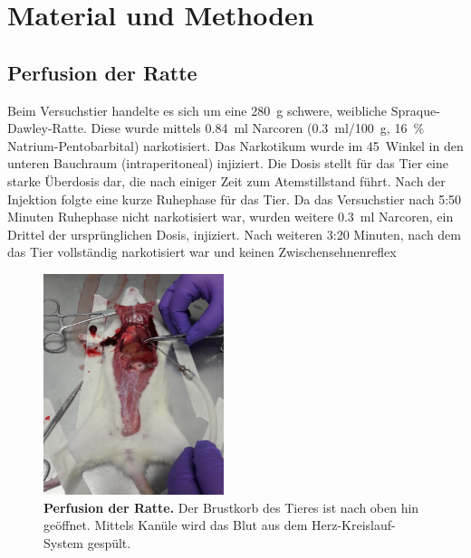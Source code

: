 \section{Material und Methoden}

\subsection{Perfusion der Ratte}

Beim Versuchstier handelte es sich um eine 280~g schwere, weibliche Spraque-Dawley-Ratte. Diese wurde mittels 0.84~ml Narcoren (0.3~ml/100~g, 16~\% Natrium-Pentobarbital) narkotisiert. Das Narkotikum wurde im 45\degree~Winkel in den unteren Bauchraum (intraperitoneal) injiziert. Die Dosis stellt für das Tier eine starke Überdosis dar, die nach einiger Zeit zum Atemstillstand führt. Nach der Injektion folgte eine kurze Ruhephase für das Tier. Da das Versuchstier nach 5:50 Minuten Ruhephase nicht narkotisiert war, wurden weitere 0.3~ml Narcoren, ein Drittel der ursprünglichen Dosis, injiziert. Nach weiteren 3:20 Minuten, nach dem das Tier vollständig narkotisiert war und keinen Zwischensehnenreflex 

\begin{figure}
    \centering
    \includegraphics[width=0.47\textwidth]{pictures/Bilder_Jule/Ratte/perfusion.png}
    \caption[Perfusion der Ratte]{\textbf{Perfusion der Ratte.} Der Brustkorb des Tieres ist nach oben hin geöffnet. Mittels Kanüle wird das Blut aus dem Herz-Kreislauf-System gespült.}
    \label{fig:perfusion}
\end{figure}

